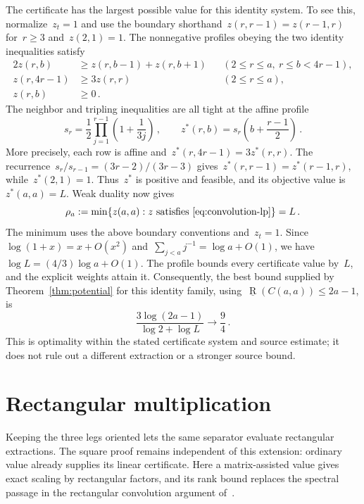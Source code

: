 \documentclass[11pt,letterpaper]{article}
\theoremstyle{definition}
\numberwithin{equation}{section}
\newcommand{\br}{\underline{\operatorname{R}}}
\begin{document}
The certificate has the largest possible value for this identity system. To see this, normalize~$z_t=1$ and use the boundary shorthand~$z(r,r-1)=z(r-1,r)$ for~$r\geq3$ and~$z(2,1)=1$. The nonnegative profiles obeying the two identity inequalities satisfy
\begin{equation}\label{eq:convolution-lp}
 \begin{aligned}
 2z(r,b)&\geq z(r,b-1)+z(r,b+1)
 &&(2\leq r\leq a,\ r\leq b<4r-1),\\
 z(r,4r-1)&\geq3z(r,r)
 &&(2\leq r\leq a),\\
 z(r,b)&\geq0\,.
 \end{aligned}
\end{equation}
The neighbor and tripling inequalities are all tight at the affine profile
\begin{equation}\label{eq:optimal-profile}
 s_r=\frac12\prod_{j=1}^{r-1}\left(1+\frac1{3j}\right)\,,\qquad
 z^*(r,b)=s_r\left(b+\frac{r-1}{2}\right)\,.
\end{equation}
More precisely, each row is affine and~$z^*(r,4r-1)=3z^*(r,r)$. The recurrence~$s_r/s_{r-1}=(3r-2)/(3r-3)$ gives~$z^*(r,r-1)=z^*(r-1,r)$, while~$z^*(2,1)=1$. Thus~$z^*$ is positive and feasible, and its objective value is~$z^*(a,a)=L$. Weak duality now gives
\begin{equation}\label{eq:profile}
 \rho_a:=\min\{z(a,a):z\text{ satisfies }\eqref{eq:convolution-lp}\}=L\,.
\end{equation}
The minimum uses the above boundary conventions and~$z_t=1$. Since~$\log(1+x)=x+O(x^2)$ and~$\sum_{j<a}j^{-1}=\log a+O(1)$, we have~$\log L=(4/3)\log a+O(1)$. The profile bounds every certificate value by~$L$, and the explicit weights attain it. Consequently, the best bound supplied by Theorem~\ref{thm:potential} for this identity family, using~$\br(C(a,a))\leq2a-1$, is
\begin{equation*}
 \frac{3\log(2a-1)}{\log2+\log L}\longrightarrow\frac94\,.
\end{equation*}
This is optimality within the stated certificate system and source estimate; it does not rule out a different extraction or a stronger source bound.


\section{Rectangular multiplication}\label{sec:rectangular}

Keeping the three legs oriented lets the same separator evaluate rectangular extractions. The square proof remains independent of this extension: ordinary value already supplies its linear certificate. Here a matrix-assisted value gives exact scaling by rectangular factors, and its rank bound replaces the spectral passage in the rectangular convolution argument of~\cite{Uznanski26}.
\end{document}
